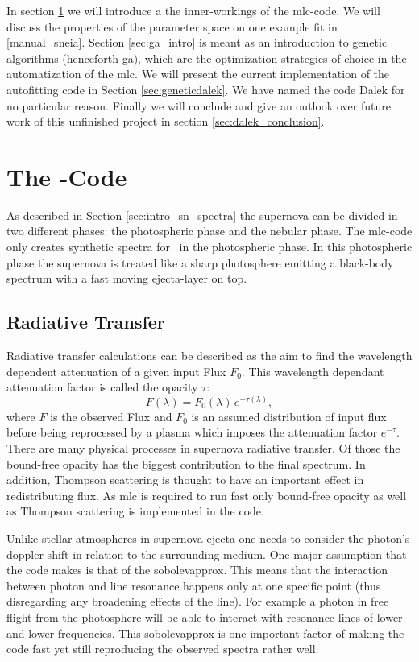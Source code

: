 In section \ref{sec:mlc_intro} we will introduce a the inner-workings of the \gls{mlc}-code.  We will discuss the properties of the parameter space on one example fit in \ref{manual_sneia}. Section \ref{sec:ga_intro} is meant as an introduction to genetic algorithms (henceforth \gls{ga}), which are the optimization strategies of choice in the automatization of the \gls{mlc}.  We will present the current implementation of the autofitting code in Section \ref{sec:geneticdalek}. We have named the code Dalek for no particular reason. Finally we will conclude and give an outlook over future work of this unfinished project in section \ref{sec:dalek_conclusion}.

\section{The -Code}
\label{sec:mlc_intro}
As described in Section \ref{sec:intro_sn_spectra} the supernova can be divided in two different phases: the photospheric phase and the nebular phase. The \gls{mlc}-code only creates synthetic spectra for \snia\ in the photospheric phase.
In this photospheric phase the supernova is treated like a sharp photosphere emitting a black-body spectrum with a fast moving ejecta-layer on top.

\subsection{Radiative Transfer}
Radiative transfer calculations can be described as the aim to find the wavelength dependent attenuation of a given input Flux $F_0$. This wavelength dependant attenuation factor is called the opacity $\tau$:
\[
	F(\lambda) = F_0(\lambda)\,e^{-\tau(\lambda)},
\]
where $F$ is the observed Flux and $F_0$ is an assumed distribution of input flux before being reprocessed by a plasma which imposes the attenuation factor $e^{-\tau}$.
There are many physical processes in supernova radiative transfer. Of those the bound-free opacity has the biggest contribution to the final spectrum. In addition, Thompson scattering is thought to have an important effect in redistributing flux. As \gls{mlc} is required to run fast only bound-free opacity as well as Thompson scattering is implemented in the code.

Unlike stellar atmospheres in supernova ejecta one needs to consider the photon's doppler shift in relation to the surrounding medium. One major assumption that the code makes is that of the \gls{sobolevapprox}.  This means that the interaction between photon and line resonance happens only at one specific point (thus disregarding any broadening effects of the line). For example a photon in free flight from the photosphere will be able to interact with resonance lines of lower and lower frequencies. This \gls{sobolevapprox} is one important factor of making the code fast yet still reproducing the observed spectra rather well.

